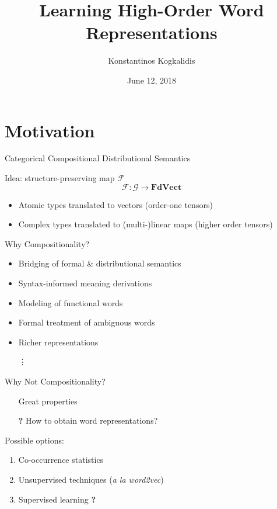 \documentclass{beamer}
\title{Learning High-Order Word Representations}
\date{June 12, 2018}
\author{Konstantinos Kogkalidis}
\institute{Logic \& Language Fan Club}
\newcommand{\xmark}{\ding{55}}
\begin{document}
  \maketitle
  
  
\section{Motivation}
\begin{frame}{Categorical Compositional Distributional Semantics}

	Idea: structure-preserving map $\mathcal{F}$
	\[
	\mathcal{F}: \mathcal{G} \to \pmb{FdVect} 
	\]
	
	\begin{itemize}	
	\item Atomic types translated to vectors (order-one tensors)
	\item Complex types translated to (multi-)linear maps (higher order tensors)
	\end{itemize}
\end{frame}
  
\begin{frame}{Why Compositionality?}
	\begin{itemize}
	\item Bridging of formal \& distributional semantics
	\item Syntax-informed meaning derivations
	\item Modeling of functional words
	\item Formal treatment of ambiguous words
	\item Richer representations
	\item[] \quad \vdots
	\end{itemize}
\end{frame}

\begin{frame}{Why Not Compositionality?}
	\begin{itemize}
	\item[\textcolor{Yes}{\checkmark}] Great properties
	\item[\textcolor{Maybe}{\textbf{?}}] How to obtain word representations?
	\end{itemize}
	
	
	Possible options:
	\begin{enumerate}
	\item Co-occurrence statistics 
	\pause \textcolor{No}{\xmark}
	\pause
	\item Unsupervised techniques (\textit{a la word2vec})
	\pause \textcolor{No}{\xmark}\
	\pause
	\item Supervised learning \textcolor{Maybe}{\textbf{?}}
	\end{enumerate}
\end{frame}
\end{document}
